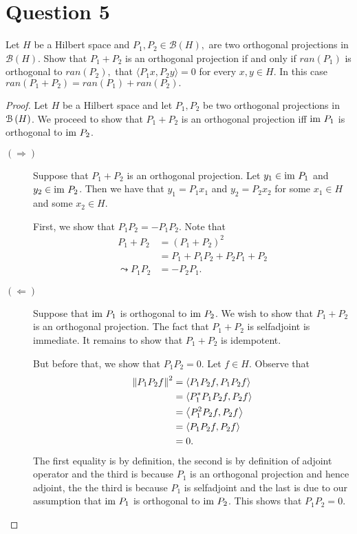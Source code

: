 \section{Question 5}

\horz

Let $H$ be a Hilbert space and $P_1, P_2\in \mathcal B(H),$ are two orthogonal projections in $\mathcal B(H).$  Show that $P_1 +P_2$ is an orthogonal projection if and only if $ran(P_1)$ is orthogonal to $ran(P_2),$ that $\langle P_1x, P_2y\rangle =0$ for every $x,y\in H.$ In this case $ran (P_1+P_2)= ran(P_1) + ran (P_2).$

\horz

\begin{proof}
    Let $H$ be a Hilbert space and let $P_{1}, P_{2}$ be two orthogonal projections in ${\cal B} \left( H \right)$. We proceed to show that $P_{1} + P_{2}$ is an orthogonal projection iff ${\text{im }} P_{1}$ is orthogonal to ${\text{im }} P_{2}$. 

    \begin{description}
	\item[$\left( \Longrightarrow \right)$] Suppose that $P_{1} + P_{2}$ is an orthogonal projection. Let $y_{1} \in {\text{im }} P_{1}$ and $y_{2} \in {\text{im }} P_{2}$. Then we have that $y_{1} = P_{1}x_{1}$ and $y_{2} =P_{2}x_{2}$ for some $x_{1} \in H$ and some $x_{2} \in H$.

	    First, we show that $P_{1} P_{2} = -P_{1} P_{2}$. Note that
	    \begin{align*}
		P_{1} + P_{2} &=  \left( P_{1} + P_{2} \right)^{2} \\
		&= P_{1} + P_{1}P_{2} + P_{2} P_{1} + P_{2} \\
		\leadsto P_{1}P_{2} &= -P_{2}P_{1}.
	    \end{align*}

	\item[$\left( \Longleftarrow \right)$] Suppose that ${\text{im }} P_{1}$ is orthogonal to ${\text{im }} P_{2}$. We wish to show that $P_{1} + P_{2}$ is an orthogonal projection. The fact that $P_{1} + P_{2}$ is selfadjoint is immediate. It remains to show that $P_{1} + P_{2}$ is idempotent.

	    But before that, we show that $P_{1}P_{2}=0$. Let $f\in H$. Observe that
	    \begin{align*}
		\left\lVert P_{1}P_{2}f \right\rVert^{2} &= \left\langle P_{1}P_{2}f, P_{1}P_{2}f \right\rangle \\
		&= \left\langle P_{1}^{*}P_{1}P_{2}f, P_{2}f \right\rangle \\
		&= \left\langle P_{1}^{2}P_{2}f, P_{2}f \right\rangle \\
		&= \left\langle P_{1}P_{2}f, P_{2}f \right\rangle \\
		&= 0.
	    \end{align*}
	    The first equality is by definition, the second is by definition of adjoint operator and the third is because $P_{1}$ is an orthogonal projection and hence adjoint, the the third is because $P_{1}$ is selfadjoint and the last is due to our assumption that ${\text{im }} P_{1}$ is orthogonal to ${\text{im }} P_{2}$. This shows that $P_{1}P_{2} = 0$.


\end{description}
\end{proof}
